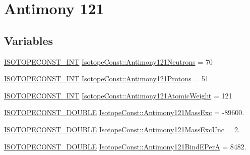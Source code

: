 \hypertarget{group___isotope_const-_antimony-_sb121}{}\section{Antimony 121}
\label{group___isotope_const-_antimony-_sb121}
\subsection*{Variables}
\begin{DoxyCompactItemize}
\item 
\mbox{\hyperlink{group___isotope_const-_macros_ga5f18360b3e99483a35c32d789e62621c}{I\+S\+O\+T\+O\+P\+E\+C\+O\+N\+S\+T\+\_\+\+I\+NT}} \mbox{\hyperlink{group___isotope_const-_antimony-_sb121_gaa7f5b5b51df8fa4217a93a20c076e8c7}{Isotope\+Const\+::\+Antimony121\+Neutrons}} = 70
\item 
\mbox{\hyperlink{group___isotope_const-_macros_ga5f18360b3e99483a35c32d789e62621c}{I\+S\+O\+T\+O\+P\+E\+C\+O\+N\+S\+T\+\_\+\+I\+NT}} \mbox{\hyperlink{group___isotope_const-_antimony-_sb121_gad40102ab37d411f44792cf02bea420c2}{Isotope\+Const\+::\+Antimony121\+Protons}} = 51
\item 
\mbox{\hyperlink{group___isotope_const-_macros_ga5f18360b3e99483a35c32d789e62621c}{I\+S\+O\+T\+O\+P\+E\+C\+O\+N\+S\+T\+\_\+\+I\+NT}} \mbox{\hyperlink{group___isotope_const-_antimony-_sb121_gad310803fb3095845ea83065932b1572b}{Isotope\+Const\+::\+Antimony121\+Atomic\+Weight}} = 121
\item 
\mbox{\hyperlink{group___isotope_const-_macros_ga8f45a7272ce02c0b4c65c44636ed719a}{I\+S\+O\+T\+O\+P\+E\+C\+O\+N\+S\+T\+\_\+\+D\+O\+U\+B\+LE}} \mbox{\hyperlink{group___isotope_const-_antimony-_sb121_ga87b0998302919b6d4a870717c5547041}{Isotope\+Const\+::\+Antimony121\+Mass\+Exc}} = -\/89600.
\item 
\mbox{\hyperlink{group___isotope_const-_macros_ga8f45a7272ce02c0b4c65c44636ed719a}{I\+S\+O\+T\+O\+P\+E\+C\+O\+N\+S\+T\+\_\+\+D\+O\+U\+B\+LE}} \mbox{\hyperlink{group___isotope_const-_antimony-_sb121_gaf1795f83b1e82875b787234f364210f0}{Isotope\+Const\+::\+Antimony121\+Mass\+Exc\+Unc}} = 2.
\item 
\mbox{\hyperlink{group___isotope_const-_macros_ga8f45a7272ce02c0b4c65c44636ed719a}{I\+S\+O\+T\+O\+P\+E\+C\+O\+N\+S\+T\+\_\+\+D\+O\+U\+B\+LE}} \mbox{\hyperlink{group___isotope_const-_antimony-_sb121_ga97c3513c655747e5275db3c9f84fec20}{Isotope\+Const\+::\+Antimony121\+Bind\+E\+PerA}} = 8482.
\item 

\end{DoxyCompactItemize}
